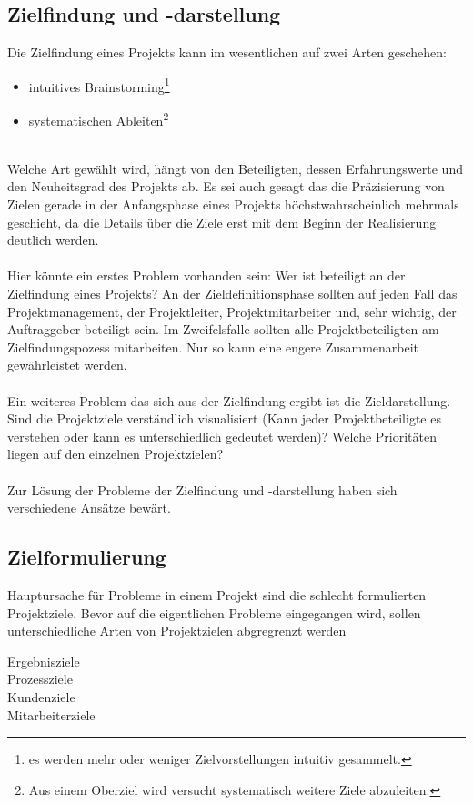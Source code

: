 \documentclass[12pt]{scrartcl}
\begin{document}
\subsection{Zielfindung und -darstellung}
Die Zielfindung eines Projekts kann im wesentlichen auf zwei Arten geschehen:
\begin{itemize}
    \item{intuitives Brainstorming\footnote{es werden mehr oder weniger Zielvorstellungen intuitiv gesammelt.}}
    \item{systematischen Ableiten\footnote{Aus einem Oberziel wird versucht systematisch weitere Ziele abzuleiten.}}
\end{itemize}
\ \\
Welche Art gewählt wird, hängt von den Beteiligten, dessen Erfahrungswerte und den Neuheitsgrad des Projekts ab. Es sei auch gesagt das die Präzisierung von Zielen gerade in der Anfangsphase eines Projekts höchstwahrscheinlich mehrmals geschieht, da die Details über die Ziele erst mit dem Beginn der Realisierung deutlich werden. \\
\\
Hier könnte ein erstes Problem vorhanden sein: Wer ist beteiligt an der Zielfindung eines Projekts? An der Zieldefinitionsphase sollten auf jeden Fall das Projektmanagement, der Projektleiter, Projektmitarbeiter und, sehr wichtig, der Auftraggeber beteiligt sein. Im Zweifelsfalle sollten alle Projektbeteiligten am Zielfindungspozess mitarbeiten. Nur so kann eine engere Zusammenarbeit gewährleistet werden.\\
\\
Ein weiteres Problem das sich aus der Zielfindung ergibt ist die Zieldarstellung. Sind die Projektziele verständlich visualisiert (Kann jeder Projektbeteiligte es verstehen oder kann es unterschiedlich gedeutet werden)? Welche Prioritäten liegen auf den einzelnen Projektzielen? \\
\\
Zur Lösung der Probleme der Zielfindung und -darstellung haben sich verschiedene Ansätze bewärt. 
\subsection{Zielformulierung}
Hauptursache für Probleme in einem Projekt sind die schlecht formulierten Projektziele. Bevor auf die eigentlichen Probleme eingegangen wird, sollen unterschiedliche Arten von Projektzielen abgregrenzt werden
\begin{description}
    \item[Ergebnisziele]
    
    \item[Prozessziele]
    \item[Kundenziele]
    \item[Mitarbeiterziele]
\end{description}
\end{document}
